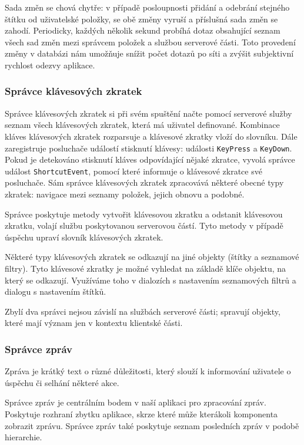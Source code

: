Sada změn se chová chytře: v případě posloupnosti přidání a odebrání stejného štítku od uživatelské položky, se obě změny vyruší a příslušná sada změn se zahodí.
Periodicky, každých několik sekund probíhá dotaz obsahující seznam všech sad změn mezi správcem položek a službou serverové části.
Toto  provedení změny v databázi nám umožňuje snížit počet dotazů po síti a zvýšit subjektivní rychlost odezvy aplikace.

\subsubsection{Správce klávesových zkratek}

Správce klávesových zkratek si při svém spuštění načte pomocí serverové služby seznam všech klávesových zkratek, která má uživatel definované.
Kombinace kláves klávesových zkratek rozparsuje a klávesové zkratky vloží do slovníku.
Dále zaregistruje posluchače událostí stisknutí klávesy: události \verb|KeyPress| a \verb|KeyDown|.
Pokud je detekováno stisknutí kláves odpovídající nějaké zkratce, vyvolá správce událost \verb|ShortcutEvent|, pomocí které informuje o klávesové zkratce své posluchače.
Sám správce klávesových zkratek zpracovává některé obecné typy zkratek: navigace mezi seznamy položek, jejich obnovu a podobné.

Správce poskytuje metody vytvořit klávesovou zkratku a odstanit klávesovou zkratku, volají službu poskytovanou serverovou částí.
Tyto metody v případě úspěchu upraví slovník klávesových zkratek.

Některé typy klávesových zkratek se odkazují na jiné objekty (štítky a seznamové filtry).
Tyto klávesové zkratky je možné vyhledat na základě klíče objektu, na který se odkazují.
Využíváme toho v dialozích s nastavením seznamových filtrů a dialogu s nastavením štítků.

\bigskip

Zbylí dva správci nejsou závislí na službách serverové části; spravují objekty, které mají význam jen v kontextu klientské části.

\subsubsection{Správce zpráv}

Zpráva je krátký text o různé důležitosti, který slouží k informování uživatele o úspěchu či selhání některé akce.

Správce zpráv je centrálním bodem v naší aplikaci pro zpracování zpráv.
Poskytuje rozhraní zbytku aplikace, skrze které může kterákoli komponenta zobrazit zprávu.
Správce zpráv také poskytuje seznam posledních zpráv v podobě hierarchie.

